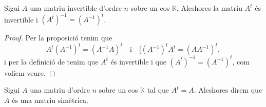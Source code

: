 \documentclass[../Apunts.tex]{subfiles}
\begin{document}
	\begin{proposition}
		\label{prop:transposada d'una invertible és invertible}
		Sigui \(A\) una matriu invertible d'ordre \(n\) sobre un cos \(\mathbb{K}\). Aleshores la matriu \(A^{t}\) és invertible i \(\left(A^{t}\right)^{-1}=\left(A^{-1}\right)^{t}\).
		\begin{proof}
			Per la proposició  tenim que
			\[A^{t}\left(A^{-1}\right)^{t}=\left(A^{-1}A\right)^{t}\quad\text{i}\quad [\left(A^{-1}\right)^{t}A^{t}=\left(AA^{-1}\right)^{t},\]
			i per la definició de  tenim que \(A^{t}\) és invertible i que \(\left(A^{t}\right)^{-1}=\left(A^{-1}\right)^{t}\), com volíem veure.
		\end{proof}
	\end{proposition}
	\begin{definition}
		\label{def:matriu simètrica}
		Sigui \(A\) una matriu d'ordre \(n\) sobre un cos \(\mathbb{K}\) tal que \(A^{t}=A\). Aleshores direm que \(A\) és una matriu simètrica.
	\end{definition}
\end{document}
